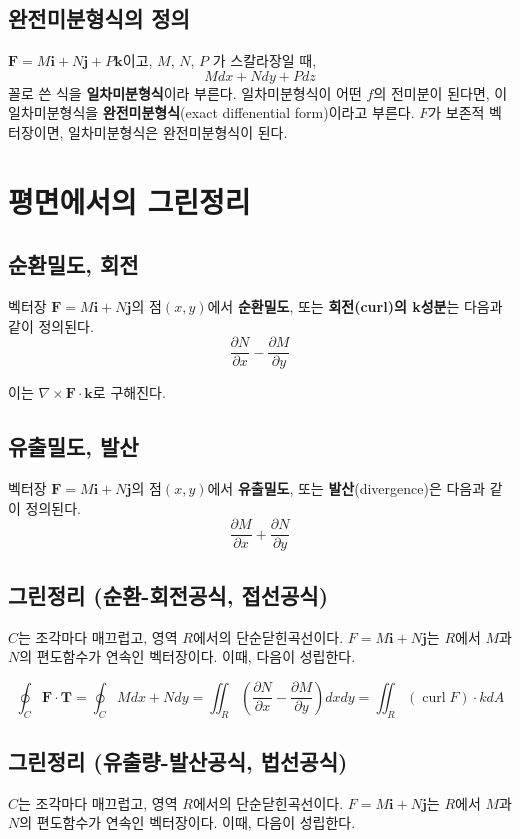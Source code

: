 \documentclass[chapter, oneside]{oblivoir}
\newcommand{\term}[1]{\textbf{#1}}
\begin{document}
\subsection{완전미분형식의 정의}
$\textbf{F}=M\textbf{i}+N\textbf{j}+P\textbf{k}$이고, $M$, $N$, $P$ 가 스칼라장일 때, 
$$ M dx + N dy + P dz$$
꼴로 쓴 식을 \term{일차미분형식}이라 부른다. 
일차미분형식이 어떤 $f$의 전미분이 된다면, 이 일차미분형식을 \term{완전미분형식}(exact diffenential form)이라고 부른다.
 $F$가 보존적 벡터장이면, 일차미분형식은 완전미분형식이 된다.


\section{평면에서의 그린정리}
\subsection{순환밀도, 회전 }
벡터장 $\textbf{F}=M\textbf{i}+N\textbf{j}$의 점$(x,y)$에서 \term{순환밀도}, 또는 \term{회전(curl)의 k성분}는 다음과 같이 정의된다.
$$\frac{\partial N}{\partial x} - \frac{\partial M}{\partial y} $$

이는 $\nabla \times \textbf{F} \cdot \textbf{k}$로 구해진다.

\subsection{유출밀도, 발산}
벡터장 $\textbf{F}=M\textbf{i}+N\textbf{j}$의 점$(x,y)$에서 \term{유출밀도}, 또는 \term{발산}(divergence)은 다음과 같이 정의된다.
$$ \frac{\partial M}{\partial x} + \frac{\partial N}{\partial y}$$

\subsection{그린정리 (순환-회전공식, 접선공식)}
$C$는 조각마다 매끄럽고, 영역 $R$에서의 단순닫힌곡선이다.
$F=M\textbf{i}+N\textbf{j}$는 $R$에서  $M$과 $N$의 편도함수가 연속인 벡터장이다.
이때, 다음이 성립한다.

$$ 
\oint_C \textbf{F} \cdot \textbf{T} 
= \oint_C M dx + N dy = \iint_R \left( \frac{\partial N}{\partial x} - \frac{\partial M}{\partial y} \right) dx dy 
= \iint_R \left( \operatorname{curl} F \right)\cdot k dA $$

\subsection{그린정리 (유출량-발산공식, 법선공식)}
$C$는 조각마다 매끄럽고, 영역 $R$에서의 단순닫힌곡선이다.
$F=M\textbf{i}+N\textbf{j}$는 $R$에서  $M$과 $N$의 편도함수가 연속인 벡터장이다.
이때, 다음이 성립한다.
\end{document}
